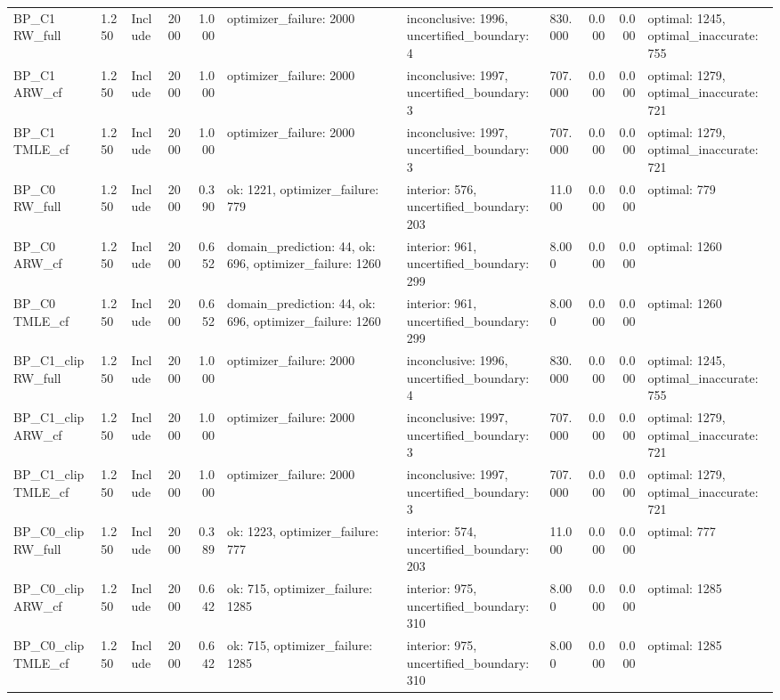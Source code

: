 \begin{tabular}{llllrlllrrl}
BP\_C1 RW\_full & 1.250 & Include & 2000 & 1.000 & optimizer\_failure: 2000 & inconclusive: 1996, uncertified\_boundary: 4 & 830.000 & 0.000 & 0.000 & optimal: 1245, optimal\_inaccurate: 755 \\
BP\_C1 ARW\_cf & 1.250 & Include & 2000 & 1.000 & optimizer\_failure: 2000 & inconclusive: 1997, uncertified\_boundary: 3 & 707.000 & 0.000 & 0.000 & optimal: 1279, optimal\_inaccurate: 721 \\
BP\_C1 TMLE\_cf & 1.250 & Include & 2000 & 1.000 & optimizer\_failure: 2000 & inconclusive: 1997, uncertified\_boundary: 3 & 707.000 & 0.000 & 0.000 & optimal: 1279, optimal\_inaccurate: 721 \\
BP\_C0 RW\_full & 1.250 & Include & 2000 & 0.390 & ok: 1221, optimizer\_failure: 779 & interior: 576, uncertified\_boundary: 203 & 11.000 & 0.000 & 0.000 & optimal: 779 \\
BP\_C0 ARW\_cf & 1.250 & Include & 2000 & 0.652 & domain\_prediction: 44, ok: 696, optimizer\_failure: 1260 & interior: 961, uncertified\_boundary: 299 & 8.000 & 0.000 & 0.000 & optimal: 1260 \\
BP\_C0 TMLE\_cf & 1.250 & Include & 2000 & 0.652 & domain\_prediction: 44, ok: 696, optimizer\_failure: 1260 & interior: 961, uncertified\_boundary: 299 & 8.000 & 0.000 & 0.000 & optimal: 1260 \\
BP\_C1\_clip RW\_full & 1.250 & Include & 2000 & 1.000 & optimizer\_failure: 2000 & inconclusive: 1996, uncertified\_boundary: 4 & 830.000 & 0.000 & 0.000 & optimal: 1245, optimal\_inaccurate: 755 \\
BP\_C1\_clip ARW\_cf & 1.250 & Include & 2000 & 1.000 & optimizer\_failure: 2000 & inconclusive: 1997, uncertified\_boundary: 3 & 707.000 & 0.000 & 0.000 & optimal: 1279, optimal\_inaccurate: 721 \\
BP\_C1\_clip TMLE\_cf & 1.250 & Include & 2000 & 1.000 & optimizer\_failure: 2000 & inconclusive: 1997, uncertified\_boundary: 3 & 707.000 & 0.000 & 0.000 & optimal: 1279, optimal\_inaccurate: 721 \\
BP\_C0\_clip RW\_full & 1.250 & Include & 2000 & 0.389 & ok: 1223, optimizer\_failure: 777 & interior: 574, uncertified\_boundary: 203 & 11.000 & 0.000 & 0.000 & optimal: 777 \\
BP\_C0\_clip ARW\_cf & 1.250 & Include & 2000 & 0.642 & ok: 715, optimizer\_failure: 1285 & interior: 975, uncertified\_boundary: 310 & 8.000 & 0.000 & 0.000 & optimal: 1285 \\
BP\_C0\_clip TMLE\_cf & 1.250 & Include & 2000 & 0.642 & ok: 715, optimizer\_failure: 1285 & interior: 975, uncertified\_boundary: 310 & 8.000 & 0.000 & 0.000 & optimal: 1285 \\

\end{tabular}
